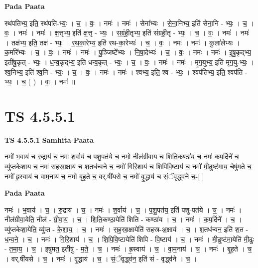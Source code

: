 \documentclass[17pt]{extarticle}
\begin{document}
\textbf{Pada Paata} \newline

रथ॑पतिभ्य॒ इति॒ रथ॑पति-भ्यः॒ । च॒ । वः॒ । नमः॑ । नमः॑ । सेना᳚भ्यः । से॒ना॒निभ्य॒ इति॑ सेना॒नि - भ्यः॒ । च॒ । वः॒ । नमः॑ । नमः॑ । क्ष॒त्तृभ्य॒ इति॑ क्ष॒त्तृ - भ्यः॒ । स॒ग्रं॒ही॒तृभ्य॒ इति॑ संग्रही॒तृ - भ्यः॒ । च॒ । वः॒ । नमः॑ । नमः॑ । तक्ष॑भ्य॒ इति॒ तक्ष॑ - भ्यः॒ । र॒थ॒का॒रेभ्य॒ इति॑ रथ-का॒रेभ्यः॑ । च॒ । वः॒ । नमः॑ । नमः॑ । कुला॑लेभ्यः । क॒र्मारे᳚भ्यः । च॒ । वः॒ । नमः॑ । नमः॑ । पु॒ञ्जिष्टे᳚भ्यः । नि॒षा॒देभ्यः॑ । च॒ । वः॒ । नमः॑ । नमः॑ । इ॒षु॒कृद्भ्य॒ इती॑षु॒कृत् - भ्यः॒ । ध॒न्व॒कृद्भ्य॒ इति॑ धन्व॒कृत् - भ्यः॒ । च॒ । वः॒ । नमः॑ । नमः॑ । मृ॒ग॒युभ्य॒ इति॑ मृग॒यु-भ्यः॒ । श्व॒निभ्य॒ इति॑ श्व॒नि - भ्यः॒ । च॒ । वः॒ । नमः॑ । नमः॑ । श्वभ्य॒ इति॒ श्व - भ्यः॒ । श्वप॑तिभ्य॒ इति॒ श्वप॑ति - भ्यः॒ । च॒ ( ) । वः॒ । नमः॑ ॥  \newline




\section*{ TS 4.5.5.1 }

\textbf{TS 4.5.5.1 } \newline
\textbf{Samhita Paata} \newline

नमो॑ भ॒वाय॑ च रु॒द्राय॑ च॒ नमः॑ श॒र्वाय॑ च पशु॒पत॑ये च॒ नमो॒ नील॑ग्रीवाय च शिति॒कण्ठा॑य च॒ नमः॑ कप॒र्दिने॑ च॒ व्यु॑प्तकेशाय च॒ नमः॑ सहस्रा॒क्षाय॑ च श॒तध॑न्वने च॒ नमो॑ गिरि॒शाय॑ च शिपिवि॒ष्टाय॑ च॒ नमो॑ मी॒ढुष्ट॑माय॒ चेषु॑मते च॒ नमो᳚ ह्र॒स्वाय॑ च वाम॒नाय॑ च॒ नमो॑ बृह॒ते च॒ वर्.षी॑यसे च॒ नमो॑ वृ॒द्धाय॑ च सं॒ॅवृद्ध्व॑ने च॒-[  ] \newline

\textbf{Pada Paata} \newline

नमः॑ । भ॒वाय॑ । च॒ । रु॒द्राय॑ । च॒ । नमः॑ । श॒र्वाय॑ । च॒ । प॒शु॒पत॑य॒ इति॑ पशु-पत॑ये । च॒ । नमः॑ । नील॑ग्रीवा॒येति॒ नील॑ - ग्री॒वा॒य॒ । च॒ । शि॒ति॒कण्ठा॒येति॑ शिति - कण्ठा॑य । च॒ । नमः॑ । क॒प॒र्दिने᳚ । च॒ । व्यु॑प्तकेशा॒येति॒ व्यु॑प्त - के॒शा॒य॒ । च॒ । नमः॑ । स॒ह॒स्रा॒क्षायेति॑ सहस्र-अ॒क्षाय॑ । च॒ । श॒तध॑न्वन॒ इति॑ श॒त - ध॒न्व॒ने॒ । च॒ । नमः॑ । गि॒रि॒शाय॑ । च॒ । शि॒पि॒वि॒ष्टायेति॑ शिपि - वि॒ष्टाय॑ । च॒ । नमः॑ । मी॒ढुष्ट॑मा॒येति॑ मी॒ढुः - त॒मा॒य॒ । च॒ । इषु॑मत॒ इतीषु॑ - म॒ते॒ । च॒ । नमः॑ । ह्र॒स्वाय॑ । च॒ । वा॒म॒नाय॑ । च॒ । नमः॑ । बृ॒ह॒ते । च॒ । वर्.षी॑यसे । च॒ । नमः॑ । वृ॒द्धाय॑ । च॒ । सं॒ॅवृद्ध्व॑न॒ इति॑ सं - वृद्ध्व॑ने । च॒ ।  \newline
\end{document}
